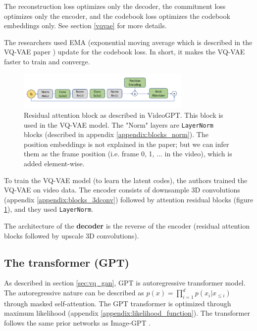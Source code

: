 The reconstruction loss optimizes only the decoder, the commitment loss optimizes only the encoder, and the codebook loss optimizes the codebook embeddings only. See section \ref{vqvae} for more details.

The researchers used EMA (exponential moving average which is described in the VQ-VAE paper \cite{vqvae}) update for the codebook loss. In short, it makes the VQ-VAE faster to train and converge.

\begin{figure}
    \centering
    \includegraphics[width=0.75\textwidth]{images/video_gpt/res_atten_block.png}
    \caption{Residual attention block as described in VideoGPT. This block is used in the VQ-VAE model. The "Norm" layers are \texttt{LayerNorm} blocks (described in appendix \ref{appendix:blocks_norm}). The position embeddings is not explained in the paper; but we can infer them as the frame position (i.e. frame 0, 1, ... in the video), which is added element-wise.}
    \label{fig:videogpt_res_atten_block}
\end{figure}

To train the VQ-VAE model (to learn the latent codes), the authors trained the VQ-VAE on video data. The encoder consists of downsample 3D convolutions (appendix \ref{appendix:blocks_3dconv}) followed by attention residual blocks (figure \ref{fig:videogpt_res_atten_block}), and they used \texttt{LayerNorm}.

The architecture of the \textbf{decoder} is the reverse of the encoder (residual attention blocks followed by upscale 3D convolutions).

\subsection*{The transformer (GPT)}

As described in section \ref{sec:vq_gan}, GPT is autoregressive transformer model. The autoregressive nature can be described as $p(x) = \prod_{i=1}^{d} p(x_i | x_{\leq i})$ through masked self-attention. The GPT transformer is optimized through maximum likelihood (appendix \ref{appendix:likelihood_function}). The transformer follows the same prior networks as Image-GPT \cite{imagegpt}.

